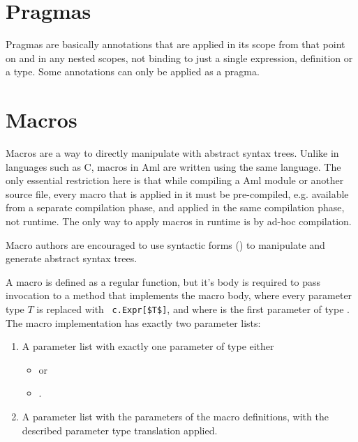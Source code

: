 \section{Pragmas}
\label{sec:pragmas}

Pragmas are basically annotations that are applied in its scope from that point on and in any nested scopes, not binding to just a single expression, definition or a type. Some annotations can only be applied as a pragma. 






\section{Macros}
\label{sec:macros}

Macros are a way to directly manipulate with abstract syntax trees. Unlike in languages such as C, macros in Aml are written using the same language. The only essential restriction here is that while compiling a Aml module or another source file, every macro that is applied in it must be pre-compiled, e.g. available from a separate compilation phase, and applied in the same compilation phase, not runtime. The only way to apply macros in runtime is by ad-hoc compilation. 

Macro authors are encouraged to use syntactic forms () to manipulate and generate abstract syntax trees. 

A macro is defined as a regular function, but it's body is required to pass invocation to a method that implements the macro body, where every parameter type $T$ is replaced with ~\lstinline!c.Expr[$T$]!, and where  is the first parameter of type . The macro implementation has exactly two parameter lists: 
\begin{enumerate}
  \item A parameter list with exactly one parameter of type either
    \begin{itemize}
      \item {} or 
      \item {}.
    \end{itemize} 
  \item A parameter list with the parameters of the macro definitions, with the described parameter type translation applied. 
\end{enumerate}

